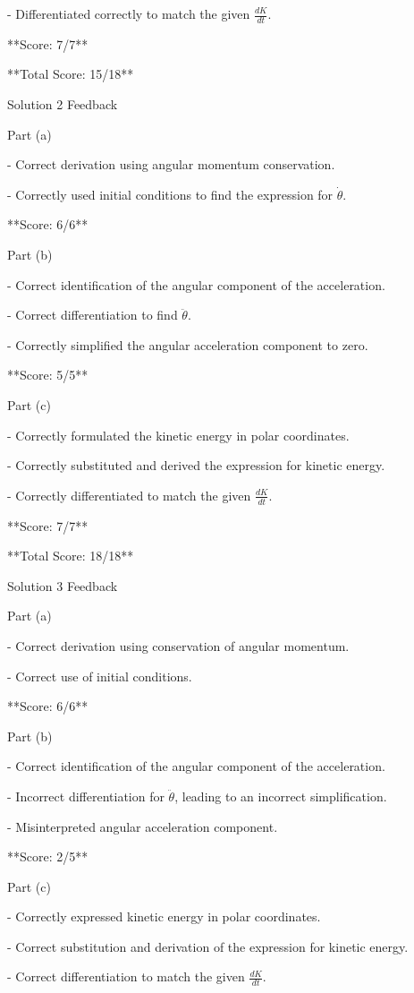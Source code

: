 \documentclass[a4paper,11pt]{article}
\begin{document}
- Differentiated correctly to match the given \(\frac{dK}{dt}\).

**Score: 7/7**

**Total Score: 15/18**

Solution 2 Feedback

Part (a)

- Correct derivation using angular momentum conservation.

- Correctly used initial conditions to find the expression for \(\dot{\theta}\).

**Score: 6/6**

Part (b)

- Correct identification of the angular component of the acceleration.

- Correct differentiation to find \(\ddot{\theta}\).

- Correctly simplified the angular acceleration component to zero.

**Score: 5/5**

Part (c)

- Correctly formulated the kinetic energy in polar coordinates.

- Correctly substituted and derived the expression for kinetic energy.

- Correctly differentiated to match the given \(\frac{dK}{dt}\).

**Score: 7/7**

**Total Score: 18/18**

Solution 3 Feedback

Part (a)

- Correct derivation using conservation of angular momentum.

- Correct use of initial conditions.

**Score: 6/6**

Part (b)

- Correct identification of the angular component of the acceleration.

- Incorrect differentiation for \(\ddot{\theta}\), leading to an incorrect simplification.

- Misinterpreted angular acceleration component.

**Score: 2/5**

Part (c)

- Correctly expressed kinetic energy in polar coordinates.

- Correct substitution and derivation of the expression for kinetic energy.

- Correct differentiation to match the given \(\frac{dK}{dt}\).
\end{document}
